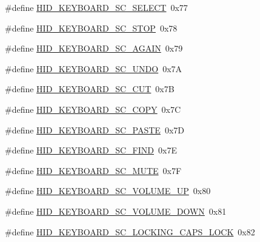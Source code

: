 \begin{DoxyCompactItemize}
\item 
\#define \hyperlink{group__Group__USBClassHIDCommon_ga45579243607db119f43e01ab71ed0635}{H\+I\+D\+\_\+\+K\+E\+Y\+B\+O\+A\+R\+D\+\_\+\+S\+C\+\_\+\+S\+E\+L\+E\+CT}~0x77
\item 
\#define \hyperlink{group__Group__USBClassHIDCommon_gaa9f71b1cb12f865c41cbacbac5823c00}{H\+I\+D\+\_\+\+K\+E\+Y\+B\+O\+A\+R\+D\+\_\+\+S\+C\+\_\+\+S\+T\+OP}~0x78
\item 
\#define \hyperlink{group__Group__USBClassHIDCommon_ga604739576119d86d923d74605a4f38a7}{H\+I\+D\+\_\+\+K\+E\+Y\+B\+O\+A\+R\+D\+\_\+\+S\+C\+\_\+\+A\+G\+A\+IN}~0x79
\item 
\#define \hyperlink{group__Group__USBClassHIDCommon_ga3d7f718b2aab826a03f3771535ee8379}{H\+I\+D\+\_\+\+K\+E\+Y\+B\+O\+A\+R\+D\+\_\+\+S\+C\+\_\+\+U\+N\+DO}~0x7A
\item 
\#define \hyperlink{group__Group__USBClassHIDCommon_ga70749c0cd90290224589c75f810ee163}{H\+I\+D\+\_\+\+K\+E\+Y\+B\+O\+A\+R\+D\+\_\+\+S\+C\+\_\+\+C\+UT}~0x7B
\item 
\#define \hyperlink{group__Group__USBClassHIDCommon_gaad8c6623b3847bf9f25c0a6235e1b294}{H\+I\+D\+\_\+\+K\+E\+Y\+B\+O\+A\+R\+D\+\_\+\+S\+C\+\_\+\+C\+O\+PY}~0x7C
\item 
\#define \hyperlink{group__Group__USBClassHIDCommon_ga73cfd310ab1358bf53c0f6d47d690b02}{H\+I\+D\+\_\+\+K\+E\+Y\+B\+O\+A\+R\+D\+\_\+\+S\+C\+\_\+\+P\+A\+S\+TE}~0x7D
\item 
\#define \hyperlink{group__Group__USBClassHIDCommon_gae29322bbd58c940979c3625a91da5c37}{H\+I\+D\+\_\+\+K\+E\+Y\+B\+O\+A\+R\+D\+\_\+\+S\+C\+\_\+\+F\+I\+ND}~0x7E
\item 
\#define \hyperlink{group__Group__USBClassHIDCommon_ga4ec9734e1a536d8d7c14d1f546269431}{H\+I\+D\+\_\+\+K\+E\+Y\+B\+O\+A\+R\+D\+\_\+\+S\+C\+\_\+\+M\+U\+TE}~0x7F
\item 
\#define \hyperlink{group__Group__USBClassHIDCommon_ga0ccae78f4a39a3b927823f0897467fa2}{H\+I\+D\+\_\+\+K\+E\+Y\+B\+O\+A\+R\+D\+\_\+\+S\+C\+\_\+\+V\+O\+L\+U\+M\+E\+\_\+\+UP}~0x80
\item 
\#define \hyperlink{group__Group__USBClassHIDCommon_ga50c0364bdda983f84dfee1f5add1f98e}{H\+I\+D\+\_\+\+K\+E\+Y\+B\+O\+A\+R\+D\+\_\+\+S\+C\+\_\+\+V\+O\+L\+U\+M\+E\+\_\+\+D\+O\+WN}~0x81
\item 
\#define \hyperlink{group__Group__USBClassHIDCommon_ga8a95605329aa8dcad2dc645cf1c9adda}{H\+I\+D\+\_\+\+K\+E\+Y\+B\+O\+A\+R\+D\+\_\+\+S\+C\+\_\+\+L\+O\+C\+K\+I\+N\+G\+\_\+\+C\+A\+P\+S\+\_\+\+L\+O\+CK}~0x82
\item 

\end{DoxyCompactItemize}

